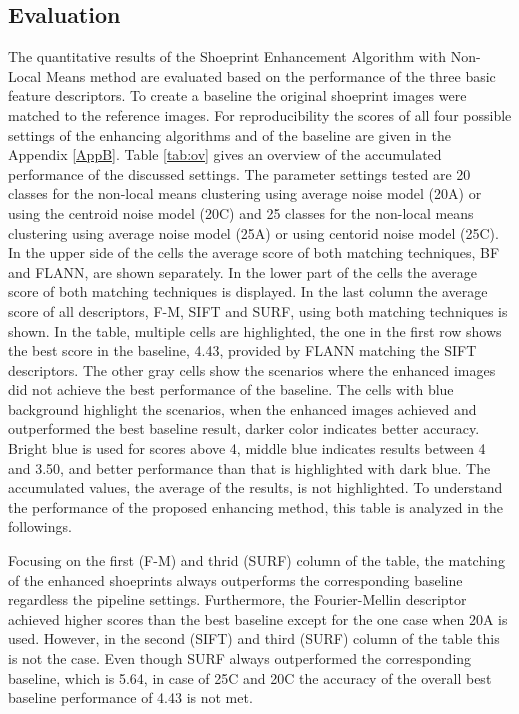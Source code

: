 \documentclass[draft,final]{vutinfth} %
\begin{document}
\subsection{Evaluation}
\par
The quantitative results of the Shoeprint Enhancement Algorithm with Non-Local Means method are evaluated based on the performance of  the three basic feature descriptors.
To create a baseline the original shoeprint images were matched to the reference images.
For reproducibility the scores of all four possible settings  of the enhancing algorithms and of the baseline are given in the Appendix \ref{AppB}.
Table \ref{tab:ov} gives an overview of the accumulated performance of the discussed settings.
The parameter settings tested are 20 classes for the non-local means clustering using average noise model (20A) or using the centroid noise model (20C) and 25 classes for the non-local means clustering using average noise model (25A) or using centorid noise model (25C).
In the upper side of the cells the average score of both matching techniques, BF and FLANN, are shown separately.
In the lower part of the cells the average score of both matching techniques is displayed.
In the last column the average score of all descriptors, F-M, SIFT and SURF, using both matching techniques is shown.
In the table, multiple cells are highlighted, the one in the first row shows the best score in the baseline, 4.43, provided by FLANN matching the SIFT descriptors.
The other gray cells show the scenarios where the enhanced images did not achieve the best performance of the baseline.
The cells with blue background highlight the scenarios, when the enhanced images achieved and outperformed the best baseline result, darker color indicates better accuracy.
Bright blue is used for scores above 4, middle blue indicates results between 4 and 3.50, and better performance than that is highlighted with dark blue.
The accumulated values, the average of the results, is not highlighted.
To understand the performance of the proposed enhancing method, this table is analyzed in the followings.
\par
Focusing on the first (F-M)  and thrid (SURF) column of the table, the matching of the enhanced shoeprints always outperforms the corresponding baseline regardless the pipeline settings.
Furthermore, the Fourier-Mellin descriptor achieved higher scores than the best baseline except for the one case when 20A is used. 
However, in the second (SIFT) and third (SURF) column of the table this is not the case.
Even though SURF always outperformed the corresponding baseline, which is 5.64, in case of 25C and 20C the accuracy of the overall best baseline performance of 4.43 is not met.
\end{document}
